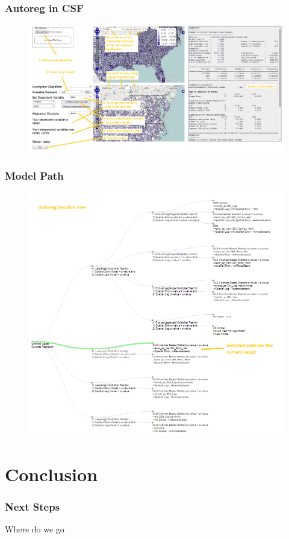 \documentclass[usepdftitle=false,professionalfonts,compress ]{beamer}
\begin{document}
{
\begin{frame}\frametitle{Autoreg in CSF}

\begin{figure}
	\includegraphics[width=.97\textwidth]{autoreg.png}\end{figure}
\end{frame}
}



{
\begin{frame}\frametitle{Model Path}

\begin{figure}
	\includegraphics[height=.97\textheight]{tree.png}\end{figure}
\end{frame}
}


\section*{Conclusion}
\begin{frame}\frametitle{Next Steps}

Where do we go
	
\end{frame}
\end{document}
